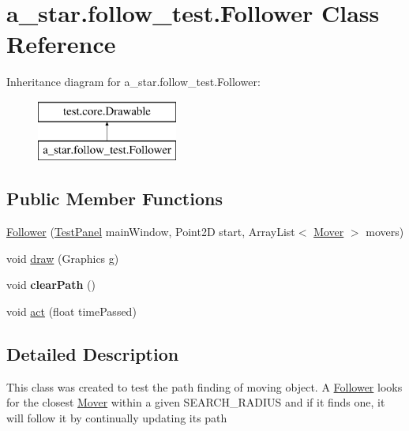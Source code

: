 \hypertarget{classa__star_1_1follow__test_1_1_follower}{\section{a\-\_\-star.\-follow\-\_\-test.\-Follower Class Reference}
\label{classa__star_1_1follow__test_1_1_follower}
}
Inheritance diagram for a\-\_\-star.\-follow\-\_\-test.\-Follower\-:\begin{figure}[H]
\begin{center}
\leavevmode
\includegraphics[height=2.000000cm]{classa__star_1_1follow__test_1_1_follower}
\end{center}
\end{figure}
\subsection*{Public Member Functions}
\begin{DoxyCompactItemize}
\item 
\hyperlink{classa__star_1_1follow__test_1_1_follower_a59e6a2777b0e45310baaf5ce428fc711}{Follower} (\hyperlink{classtest_1_1core_1_1_test_panel}{Test\-Panel} main\-Window, Point2\-D start, Array\-List$<$ \hyperlink{classa__star_1_1follow__test_1_1_mover}{Mover} $>$ movers)
\item 
void \hyperlink{classa__star_1_1follow__test_1_1_follower_a7535656635da25bf0745b16c5ea3b6e1}{draw} (Graphics g)
\item 
\hypertarget{classa__star_1_1follow__test_1_1_follower_a923a5bb4c47cc6acf5c310393c611d23}{void {\bfseries clear\-Path} ()}\label{classa__star_1_1follow__test_1_1_follower_a923a5bb4c47cc6acf5c310393c611d23}

\item 
void \hyperlink{classa__star_1_1follow__test_1_1_follower_a2a826175f83c707904cd590e105981b5}{act} (float time\-Passed)
\end{DoxyCompactItemize}


\subsection{Detailed Description}
This class was created to test the path finding of moving object. A \hyperlink{classa__star_1_1follow__test_1_1_follower}{Follower} looks for the closest \hyperlink{classa__star_1_1follow__test_1_1_mover}{Mover} within a given S\-E\-A\-R\-C\-H\-\_\-\-R\-A\-D\-I\-U\-S and if it finds one, it will follow it by continually updating its path

